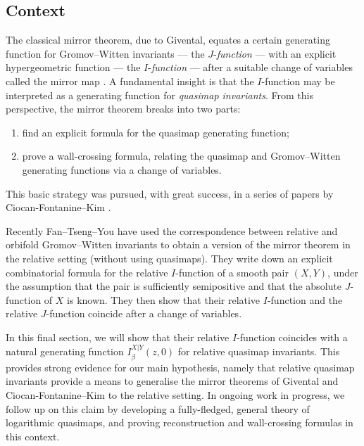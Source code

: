 \documentclass[10pt]{amsart}
\theoremstyle{definition}
\theoremstyle{definition}
\begin{document}
\subsection{Context}
The classical mirror theorem, due to Givental, equates a certain generating function for Gromov--Witten invariants --- the $J$-\emph{function} --- with an explicit hypergeometric function --- the $I$-\emph{function} --- after a suitable change of variables called the mirror map \cite{Givental-mirror}. A fundamental insight is that the $I$-function may be interpreted as a generating function for \emph{quasimap invariants}. From this perspective, the mirror theorem breaks into two parts:
\begin{enumerate}
\item find an explicit formula for the quasimap generating function;
\item prove a wall-crossing formula, relating the quasimap and Gromov--Witten generating functions via a change of variables.
\end{enumerate}
This basic strategy was pursued, with great success, in a series of papers by Ciocan-Fontanine--Kim \cite{CFKBigI,CF-K-wallcrossing,CF-K-MirrorSymmetry}.

Recently \cite{FanTsengYou} Fan--Tseng--You have used the correspondence between relative and orbifold Gromov--Witten invariants \cite{AbramovichCadmanWise} to obtain a version of the mirror theorem in the relative setting (without using quasimaps). They write down an explicit combinatorial formula for the relative $I$-function of a smooth pair $(X,Y)$, under the assumption that the pair is sufficiently semipositive and that the absolute $J$-function of $X$ is known. They then show \cite[Theorem 4.3]{FanTsengYou} that their relative $I$-function and the relative $J$-function coincide after a change of variables.

In this final section, we will show that their relative $I$-function coincides with a natural generating function $I_\beta^{X|Y}(z,0)$ for relative quasimap invariants. This provides strong evidence for our main hypothesis, namely that relative quasimap invariants provide a means to generalise the mirror theorems of Givental and Ciocan-Fontanine--Kim to the relative setting. In ongoing work in progress, we follow up on this claim by developing a fully-fledged, general theory of logarithmic quasimaps, and proving reconstruction and wall-crossing formulas in this context.
\end{document}
